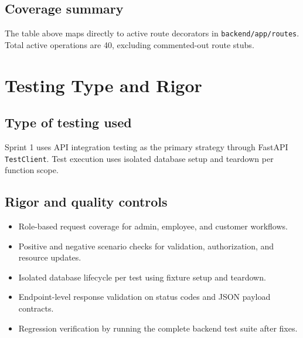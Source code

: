 \documentclass[11pt,a4paper]{article}
\newcommand{\apipath}[1]{\texttt{#1}}
\begin{document}
\subsection{Coverage summary}
The table above maps directly to active route decorators in \apipath{backend/app/routes}. Total active operations are 40, excluding commented-out route stubs.

\section{Testing Type and Rigor}
\subsection{Type of testing used}
Sprint 1 uses API integration testing as the primary strategy through FastAPI \texttt{TestClient}. Test execution uses isolated database setup and teardown per function scope.

\subsection{Rigor and quality controls}
\begin{itemize}[leftmargin=1.2cm]
  \item Role-based request coverage for admin, employee, and customer workflows.
  \item Positive and negative scenario checks for validation, authorization, and resource updates.
  \item Isolated database lifecycle per test using fixture setup and teardown.
  \item Endpoint-level response validation on status codes and JSON payload contracts.
  \item Regression verification by running the complete backend test suite after fixes.
\end{itemize}
\end{document}
